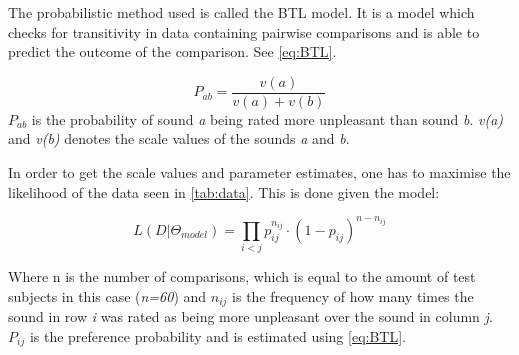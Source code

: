 \noindent The probabilistic method used is called the BTL model. It is a model which checks for transitivity in data containing pairwise comparisons and is able to predict the outcome of the comparison. See \autoref{eq:BTL}.

\begin{equation}
P_{ab} =\frac{v(a)}{v(a)+v(b)} 
\label{eq:BTL}
\end{equation}
%
$P_{ab}$ is the probability of sound \textit{a} being rated more unpleasant than sound \textit{b}. \textit{v(a)} and \textit{v(b)} denotes the scale values of the sounds \textit{a} and \textit{b}.
%




In order to get the scale values and parameter estimates, one has to maximise the likelihood of the data seen in \autoref{tab:data}. This is done given the model: 

\begin{equation}
L(D|\Theta_{model}) = \prod_{i<j} p_{ij} ^{n_{ij}}\cdot(1- p_{ij})^{n-n_{ij}}
\end{equation}

\noindent Where n is the number of comparisons, which is equal to the amount of test subjects in this case (\textit{n=60}) and $n_{ij}$ is the frequency of how many times the sound in row \textit{i} was rated as being more unpleasant over the sound in column \textit{j}. $P_{ij}$ is the preference probability and is estimated using \autoref{eq:BTL}. 
